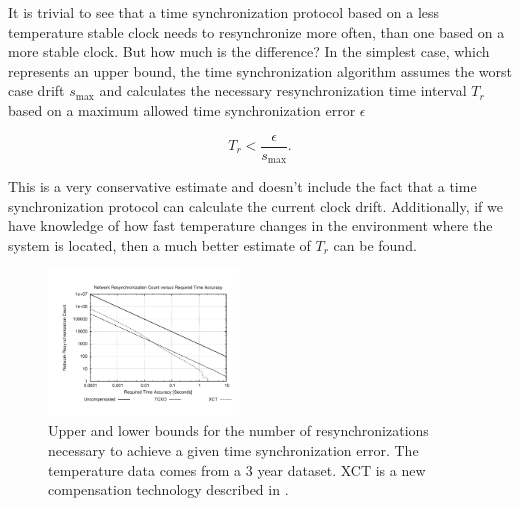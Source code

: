 It is trivial to see that a time synchronization protocol based on a less
temperature stable clock needs to resynchronize more often, than one based on
a more stable clock. But how much is the difference? In the simplest case,
which represents an upper bound, the time synchronization algorithm assumes
the worst case drift $s_{\max}$ and calculates the necessary resynchronization
time interval $T_r$ based on a maximum allowed time synchronization error
$\epsilon$

\begin{equation}
    T_r < \frac{\epsilon}{s_{\max}}.
\end{equation}

This is a very conservative estimate and doesn't include the fact that a time
synchronization protocol can calculate the current clock drift. Additionally,
if we have knowledge of how fast temperature changes in the environment where
the system is located, then a much better estimate of $T_r$ can be found. 

\begin{figure}
    \begin{center}
        \includegraphics[angle=-90,width=0.45\textwidth]{figures/mosscamresync}
        \caption{Upper and lower bounds for the number of resynchronizations
        necessary to achieve a given time synchronization error. The
        temperature data comes from a 3 year dataset. XCT is a new
        compensation technology described in \cite{schmid2008scxo}.}
        \label{fig:resync}
    \end{center}
\end{figure}


